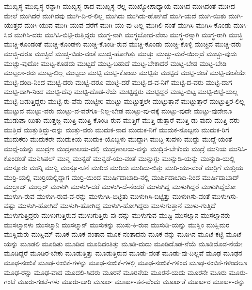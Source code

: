 {ಮುಖ್ಯಸ್ಥ
ಮುಖ್ಯಸ್ಥ-ರನ್ನಾಗಿ
ಮುಖ್ಯಸ್ಥ-ರಾದ
ಮುಖ್ಯಸ್ಥ-ರೆಲ್ಲ
ಮುಖ್ಯೋಪಾಧ್ಯಾಯ
ಮುಗಿದ
ಮುಗಿದಂತೆ
ಮುಗಿದ-ಮೇಲೆ
ಮುಗಿದರೆ
ಮುಗಿದವು
ಮುಗಿ-ದಿ-ರ-ಲಿಲ್ಲ
ಮುಗಿದು
ಮುಗಿದು-ಹೋಗಿವೆ
ಮುಗಿ-ಯದೆ
ಮುಗಿ-ಯಿತು
ಮುಗಿ-ಯುತ್ತದೆ
ಮುಗಿ-ಯುವ
ಮುಗಿ-ಯುವ-ವರೆಗೆ
ಮುಗಿ-ಯು-ವು-ದಿಲ್ಲ
ಮುಗಿಲಿ-ನಂತೆ
ಮುಗಿಸಿ
ಮುಗಿಸಿ-ಕೊಂಡು
ಮುಗಿ-ಸಿದ
ಮುಗಿಸಿ-ದರು
ಮುಗಿಸಿ-ಬಿಟ್ಟಿ-ರುತ್ತಿದ್ದರು
ಮುಗ್ಧ-ನಾಗಿ
ಮುಗ್ಧಬೋಧ-ವೆಂಬ
ಮುಗ್ಧ-ರನ್ನಾಗಿ
ಮುಗ್ಧ-ರಾಗಿ
ಮುಚ್ಚಿ
ಮುಚ್ಚಿ-ಕೊಂಡಂತೆ
ಮುಚ್ಚಿ-ಕೊಂಡಳು
ಮುಚ್ಚಿ-ಕೊಂಡಿ-ರುವ
ಮುಚ್ಚಿ-ಕೊಂಡು
ಮುಚ್ಚಿ-ಕೊಳ್ಳಿ
ಮುಚ್ಚಿದ
ಮುಚ್ಚಿ-ದರು
ಮುಚ್ಚಿ-ದರೂ
ಮುಚ್ಚಿದೆ
ಮುಚ್ಚಿ-ಬಿಡು-ವಂತೆ
ಮುಚ್ಚಿ-ಹೋಗಿತ್ತು
ಮುಚ್ಚು
ಮುಚ್ಚು-ಮರೆ-ಯಿಲ್ಲದೆ
ಮುಚ್ಚು-ವುದು
ಮುಚ್ಚು-ವುದೋ
ಮುಟ್ಟ-ಕೂಡದು
ಮುಟ್ಟದೆ
ಮುಟ್ಟ-ಬಹುದೆ
ಮುಟ್ಟ-ಬೇಕಾದರೆ
ಮುಟ್ಟ-ಬೇಡ
ಮುಟ್ಟ-ಬೇಡಿ
ಮುಟ್ಟಲಾ-ರರು
ಮುಟ್ಟ-ಲಿಲ್ಲ
ಮುಟ್ಟಲು
ಮುಟ್ಟಿ
ಮುಟ್ಟಿ-ಕೊಂಡು
ಮುಟ್ಟಿತು
ಮುಟ್ಟಿದ
ಮುಟ್ಟಿ-ದಂತೆ
ಮುಟ್ಟಿ-ದಂತೆಯೇ
ಮುಟ್ಟಿ-ದಂದಿ-ನಿಂದ
ಮುಟ್ಟಿ-ದರು
ಮುಟ್ಟಿ-ದರೂ
ಮುಟ್ಟಿ-ದರೆ
ಮುಟ್ಟಿ-ದ-ವ-ನಿಗೆ
ಮುಟ್ಟಿ-ದ-ವರು
ಮುಟ್ಟಿ-ದಾಗ
ಮುಟ್ಟಿ-ದಾಗಿ-ನಿಂದ
ಮುಟ್ಟಿ-ದೆವು
ಮುಟ್ಟಿ-ದೊಡ-ನೆಯೆ
ಮುಟ್ಟಿದ್ದರು
ಮುಟ್ಟಿದ್ದರೆ
ಮುಟ್ಟಿ-ಬಿಟ್ಟ
ಮುಟ್ಟಿ-ಬಿಟ್ಟೆ-ಯಲ್ಲ
ಮುಟ್ಟಿ-ಬಿಡುತ್ತಿದ್ದರು
ಮುಟ್ಟಿ-ರು-ವೆನು
ಮುಟ್ಟೀರಿ
ಮುಟ್ಟು
ಮುಟ್ಟುತ್ತಲೇ
ಮುಟ್ಟುತ್ತಾನೆ
ಮುಟ್ಟುತ್ತಾರೆ
ಮುಟ್ಟುತ್ತಿರ-ಲಿಲ್ಲ
ಮುಟ್ಟುವ
ಮುಟ್ಟು-ವರು
ಮುಟ್ಟು-ವ-ವರೆಗೂ--ನಿಲ್ಲ-ಬೇಡ
ಮುಟ್ಟು-ವು-ದಕ್ಕೆ
ಮುಟ್ಟು-ವುದೇ
ಮುಟ್ಟು-ವುದೇನೂ
ಮುಡುಪಾ-ಯಿತು
ಮುತ್ತಜ್ಜ
ಮುತ್ತಿ
ಮುತ್ತಿ-ಕೊಂಡಿ-ರುವ
ಮುತ್ತಿಗೆ
ಮುತ್ತಿ-ಡುತ್ತಾರೆ
ಮುತ್ತಿ-ಡು-ವುದು
ಮುತ್ತಿ-ದರು
ಮುತ್ತಿದೆ
ಮುತ್ತುತ್ತಿದ್ದು-ದನ್ನು
ಮುತ್ತು-ವರು
ಮುದುಕ-ನಾದ
ಮುದುಕ-ನಿಗೆ
ಮುದುಕ-ನೊಬ್ಬನು
ಮುದುಕ-ರಿಗೆ
ಮುದುಕರು
ಮುದುಕರೇ
ಮುದುಕಿಯ
ಮುದುಕಿ-ಯೊಬ್ಬಳು
ಮುದ್ದಾಗಿ
ಮುದ್ದಿ-ಸುವಳು
ಮುದ್ದು
ಮುದ್ದೆ-ಯಂತೆ
ಮುದ್ದೆ-ಯನ್ನು
ಮುದ್ರಣ
ಮುದ್ರಣಾಲಯ-ದಲ್ಲಿ
ಮುದ್ರಣಾಲಯ-ವನ್ನು
ಮುದ್ರಿಸ-ಬೇಕೆಂದು
ಮುದ್ರೆ
ಮುನಿಯ
ಮುನಿಸಿ-ಕೊಂಡಂತೆ
ಮುನಿಸಿಪಲ್
ಮುನ್ನ
ಮುನ್ನಡೆ
ಮುನ್ನಡೆ-ಯು-ವಂತೆ
ಮುನ್ನುಗ್ಗು
ಮುನ್ನುಡಿ-ಯನ್ನು
ಮುನ್ನುಡಿ-ಯಲ್ಲಿ
ಮುನ್ನೂರು
ಮುನ್ಶಿ
ಮುನ್ಷಿ
ಮುನ್ಸೂ-ಚನೆ
ಮುರಿದ
ಮುರಿದು
ಮುರಿದು-ಬಿತ್ತು
ಮುರಿ-ಯು-ವಂತೆ
ಮುರ್ರಿಗೆ
ಮುರ್ರಿಯ
ಮುರ್ರಿ-ಯಲ್ಲಿ
ಮುರ್ರಿಯಲ್ಲಿದ್ದಾಗ
ಮುರ್ರಿ-ಯಿಂದ
ಮುರ್ಷಿದಾಬಾದಿ-ನಲ್ಲಿ
ಮುರ್ಷಿದಾಬಾದಿ-ನಿಂದ
ಮುರ್ಷಿದಾಬಾದ್
ಮುಲ್ರಾಜ್
ಮುಲ್ಲರ್
ಮುಳುಗಿ
ಮುಳುಗಿ-ದರೆ
ಮುಳುಗಿ-ದೆ-ನೆಂದರೆ
ಮುಳುಗಿದ್ದ
ಮುಳುಗಿದ್ದರೆ
ಮುಳುಗಿದ್ದೆಯೋ
ಮುಳುಗಿ-ರುವ
ಮುಳುಗಿ-ರುವ-ವ-ರನ್ನು
ಮುಳುಗಿಸಿ-ಬಿಟ್ಟಿತು
ಮುಳುಗಿಸಿ-ಬಿಟ್ಟಿತ್ತು
ಮುಳುಗಿಸು-ವಂತೆ
ಮುಳುಗಿಸು-ವಷ್ಟು
ಮುಳುಗಿ-ಹೋಗಿದೆ
ಮುಳುಗಿ-ಹೋಗಿದ್ದ
ಮುಳುಗಿ-ಹೋಗಿದ್ದರು
ಮುಳುಗುತ್ತಾನೆ
ಮುಳು-ಗುತ್ತಿದೆ
ಮುಳುಗುತ್ತಿದ್ದರು
ಮುಳುಗುತ್ತಿರುವ
ಮುಳುಗುತ್ತಿರು-ವು-ದನ್ನು
ಮುಳುಗುವ
ಮುಷ್ಟಿ
ಮುಸಲ್ಮಾನ
ಮುಸಲ್ಮಾನರು
ಮುಸಲ್ಮಾನಳು
ಮುಸಲ್ಮಾನಿ
ಮುಸಲ್ಮಾನ್
ಮುಸುಕನ್ನು
ಮುಸು-ಕಿ-ರುವ
ಮುಸುಡಿ-ಯನ್ನು
ಮುಸ್ಲಿಂ
ಮುಸ್ಲಿಮರ
ಮುಸ್ಲಿಮರು
ಮುಸ್ಲಿಮ್
ಮೂಕ
ಮೂಕ-ನಂತಾದ
ಮೂಕ-ನಂತಾದನು
ಮೂಕ-ನನ್ನು
ಮೂಗಿನ
ಮೂಟೆ-ಕಟ್ಟಿ
ಮೂಟೆ-ಯನ್ನು
ಮೂಡಲಿ
ಮೂಡಿತು
ಮೂಡಿದ
ಮೂಡಿದಂತಿತ್ತು
ಮೂಡಿ-ದುದು
ಮೂಡಿದೊಡ-ನೆಯೆ
ಮೂಡಿದೊಡ-ನೆಯೇ
ಮೂಡಿದ್ದರೆ
ಮೂಡಿರ-ಬೇಕು
ಮೂಡುತ್ತಿತ್ತು
ಮೂಡುತ್ತಿರುವ
ಮೂಡು-ವಂತೆ
ಮೂಡು-ವು-ದಿಲ್ಲವೆ
ಮೂಢ
ಮೂಢನ
ಮೂಢ-ನಂಬಿಕೆ
ಮೂಢ-ನಂಬಿಕೆ-ಗಳನ್ನು
ಮೂಢ-ನಂಬಿಕೆ-ಗಳಲ್ಲಿ
ಮೂಢ-ನಂಬಿಕೆ-ಗಳಿಂದ
ಮೂಢ-ನಂಬಿಕೆ-ಗಳಿಂದಲೂ
ಮೂಢ-ರನ್ನು
ಮೂಢ-ವಾದ
ಮೂದಲಿ-ಸಿದರು
ಮೂರನೆ
ಮೂರನೆಯ
ಮೂರನೆ-ಯದು
ಮೂರನೇ
ಮೂರು
ಮೂರು-ಗಂಟೆ
ಮೂರು-ಗಂಟೆ-ಗಳು
ಮೂರು-ಬಾರಿ
ಮೂರ್ಖ
ಮೂರ್ಖ-ತನ-ವೆಂದು
ಮೂರ್ಖತೆ
ಮೂರ್ಖರ
ಮೂರ್ಖ-ರನ್ನು
}
